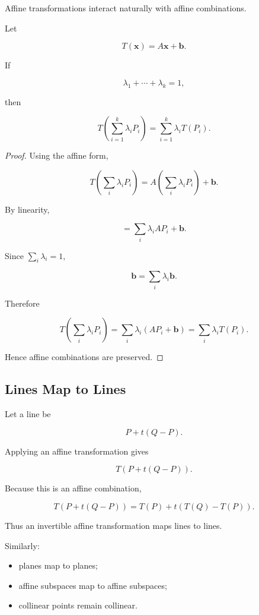 Affine transformations interact naturally with affine combinations.

\begin{theorem}
Let

\[ T(\mathbf{x})=A\mathbf{x}+\mathbf{b}. \]

If

\[ \lambda_1+\cdots+\lambda_k=1, \]

then

\[
\boxed{
T\left(\sum_{i=1}^{k}\lambda_iP_i\right)
=
\sum_{i=1}^{k}\lambda_iT(P_i).
}
\]
\end{theorem}

\begin{proof}
Using the affine form,

\[
T\left(\sum_i\lambda_iP_i\right)
=
A\left(\sum_i\lambda_iP_i\right)+\mathbf{b}.
\]

By linearity,

\[
=
\sum_i\lambda_iAP_i+\mathbf{b}.
\]

Since \(\sum_i\lambda_i=1\),

\[
\mathbf{b}
=
\sum_i\lambda_i\mathbf{b}.
\]

Therefore

\[
T\left(\sum_i\lambda_iP_i\right)
=
\sum_i\lambda_i(AP_i+\mathbf{b})
=
\sum_i\lambda_iT(P_i).
\]

Hence affine combinations are preserved.
\end{proof}

\subsection{Lines Map to Lines}
\label{subsec:affine-lines-map-lines}

Let a line be

\[ P+t(Q-P). \]

Applying an affine transformation gives

\[
T(P+t(Q-P)).
\]

Because this is an affine combination,

\[
T(P+t(Q-P))
=
T(P)+t(T(Q)-T(P)).
\]

Thus an invertible affine transformation maps lines to lines.

Similarly:

\begin{itemize}
    \item planes map to planes;
    \item affine subspaces map to affine subspaces;
    \item collinear points remain collinear.
\end{itemize}

